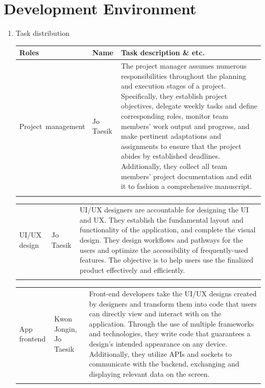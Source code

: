 \documentclass[11pt, conference]{IEEEtran}
\begin{document}
\section{\Large{Development Environment}}
\begin{enumerate}[label=\arabic*]
    \item {\large{Task distribution}}
    \begin{table}[H]
    \center
    \begin{tabular}{m{1.4cm} m{1.5cm} m{4cm}}
    \toprule
    Roles & Name & Task description \& etc.\\
    \midrule
    Project\ management & Jo Taesik & The project manager assumes numerous responsibilities throughout the planning and execution stages of a project. Specifically, they establish project objectives, delegate weekly tasks and define corresponding roles, monitor team members' work output and progress, and make pertinent adaptations and assignments to ensure that the project abides by established deadlines. Additionally, they collect all team members' project documentation and edit it to fashion a comprehensive manuscript. \\\\
    \bottomrule
    \end{tabular}
    \end{table}
    
    \begin{table}[H]
    \center
    \begin{tabular}{m{1.4cm} m{1.5cm} m{4cm}}
    UI/UX design & Jo Taesik & UI/UX designers are accountable for designing the UI and UX. They establish the fundamental layout and functionality of the application, and complete the visual design. They design workflows and pathways for the users and optimize the accessibility of frequently-used features. The objective is to help users use the finalized product effectively and efficiently. \\\\
    \bottomrule
    \end{tabular}
    \end{table}

    \begin{table}[H]
    \center
    \begin{tabular}{m{1.4cm} m{1.5cm} m{4cm}}
    App frontend & Kwon Jongin, Jo Taesik & Front-end developers take the UI/UX designs created by designers and transform them into code that users can directly view and interact with on the application. Through the use of multiple frameworks and technologies, they write code that guarantees a design’s intended appearance on any device. Additionally, they utilize APIs and sockets to communicate with the backend, exchanging and displaying relevant data on the screen. \\\\
    \bottomrule
    \end{tabular}
    \end{table}


\end{enumerate}
\end{document}
